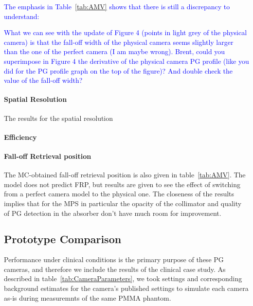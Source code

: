 \documentclass[a4paper,english,12pt]{article}
\newcommand{\et}[2][blue]{\textcolor{#1}{#2}}
\begin{document}
\et{The emphasis in Table~\ref{tab:AMV} shows that there is still a discrepancy to understand:}
	
\et{What we can see with the update of Figure 4 (points in light grey of the physical camera) is that the fall-off width of the physical camera seems slightly larger than the one of the perfect camera (I am maybe wrong). Brent, could you superimpose in Figure 4 the derivative of the physical camera PG profile (like you did for the PG profile graph on the top of the figure)? And double check the value of the fall-off width?}

\paragraph{Spatial Resolution} The results for the spatial resolution 

\paragraph{Efficiency}

\paragraph{Fall-off Retrieval position} The MC-obtained fall-off retrieval position is also given in table~\ref{tab:AMV}. The model does not predict FRP, but results are given to see the effect of switching from a perfect camera model to the physical one. The closeness of the results implies that for the MPS in particular the opacity of the collimator and quality of PG detection in the absorber don't have much room for improvement.


\subsection{Prototype Comparison}

Performance under clinical conditions is the primary purpose of these PG cameras, and therefore we include the results of the clinical case study. As described in table~\ref{tab:CameraParameters}, we took settings and corresponding background estimates for the camera's published settings to simulate each camera as-is during measuremnts of the same PMMA phantom.
\end{document}

